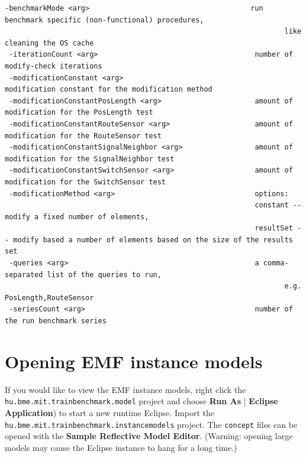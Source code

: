 \begin{lstlisting}[keywordstyle=\ttfamily]
 -benchmarkMode <arg>                                      run benchmark specific (non-functional) procedures,
                                                                  like cleaning the OS cache
 -iterationCount <arg>                                     number of modify-check iterations
 -modificationConstant <arg>                               modification constant for the modification method
 -modificationConstantPosLength <arg>                      amount of modification for the PosLength test
 -modificationConstantRouteSensor <arg>                    amount of modification for the RouteSensor test
 -modificationConstantSignalNeighbor <arg>                 amount of modification for the SignalNeighbor test
 -modificationConstantSwitchSensor <arg>                   amount of modification for the SwitchSensor test
 -modificationMethod <arg>                                 options:
                                                           constant -- modify a fixed number of elements,
                                                           resultSet -- modify based a number of elements based on the size of the results set
 -queries <arg>                                            a comma-separated list of the queries to run,
                                                                  e.g. PosLength,RouteSensor
 -seriesCount <arg>                                        number of the run benchmark series
\end{lstlisting}

\section{Opening EMF instance models}

If you would like to view the EMF instance models, right click the \texttt{hu.bme.mit.trainbenchmark.model} project and choose \textbf{Run As} | \textbf{Eclipse Application}) to start a new runtime Eclipse. Import the \texttt{hu.bme.mit.trainbenchmark.instancemodels} project. The \texttt{concept} files can be opened with the \textbf{Sample Reflective Model Editor}. (Warning: opening large models may cause the Eclipse instance to hang for a long time.)